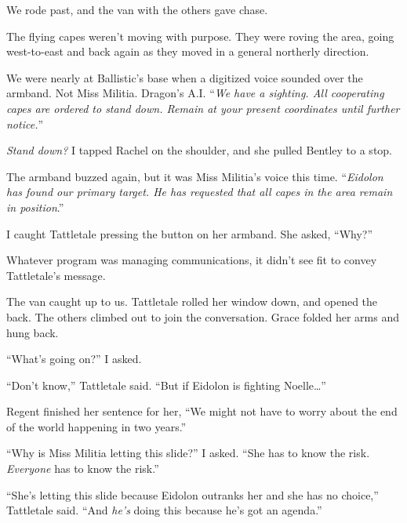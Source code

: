 We rode past, and the van with the others gave chase.



The flying capes weren't moving with purpose.  They were roving the area, going west-to-east and back again as they moved in a general northerly direction.



We were nearly at Ballistic's base when a digitized voice sounded over the armband.  Not Miss Militia.  Dragon's A.I.   ``\emph{We have a sighting.  All cooperating capes are ordered to stand down.  Remain at your present coordinates until further notice.}''



\emph{Stand down?  }I tapped Rachel on the shoulder, and she pulled Bentley to a stop.



The armband buzzed again, but it was Miss Militia's voice this time.  ``\emph{Eidolon has found our primary target.  He has requested that all capes in the area remain in position}.''



I caught Tattletale pressing the button on her armband.  She asked, ``Why?''



Whatever program was managing communications, it didn't see fit to convey Tattletale's message.



The van caught up to us.  Tattletale rolled her window down, and opened the back.  The others climbed out to join the conversation.  Grace folded her arms and hung back.



``What's going on?''  I asked.



``Don't know,'' Tattletale said.  ``But if Eidolon is fighting Noelle\ldots''



Regent finished her sentence for her, ``We might not have to worry about the end of the world happening in two years.''



``Why is Miss Militia letting this slide?'' I asked.  ``She has to know the risk.  \emph{Everyone} has to know the risk.''



``She's letting this slide because Eidolon outranks her and she has no choice,'' Tattletale said.  ``And \emph{he's} doing this because he's got an agenda.''



